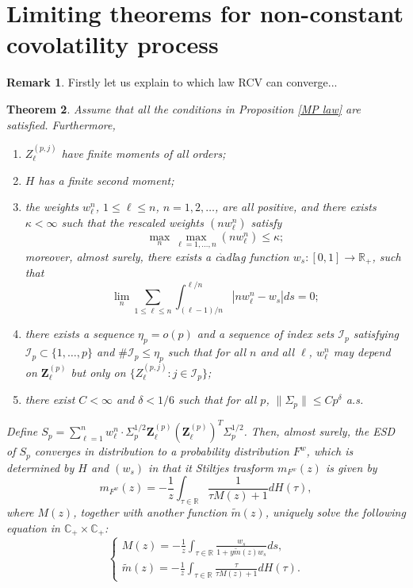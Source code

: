 \documentclass[a4paper,11pt]{article}
\theoremstyle{plain}
\newtheorem{thm}{Theorem}[part]%
\theoremstyle{definition}
\newtheorem{rmrk}[thm]{Remark}
\newcommand{\MR}{\mathbb{R}}
\begin{document}
    \pagebreak
    \part{Limiting theorems for non-constant covolatility process}
    
    \begin{rmrk}
    	Firstly let us explain to which law RCV can converge...
    \end{rmrk}
    
    \begin{thm} \label{Thm 1}
    	Assume that all the conditions in Proposition \ref{MP law} are satisfied. Furthermore,
    	\begin{enumerate}
    		\item $Z_\ell^{(p, j)}$ have finite moments of all orders;
    		\item $H$ has a finite second moment;
    		\item the weights $w_\ell^n$, $1 \leq \ell \leq n$, $n = 1, 2, \dots$, are all positive, and there exists $\kappa < \infty$ such that the rescaled weights $(nw_\ell^n)$ satisfy
    		\[ \max_n \max_{\ell = 1, \dots, n} (nw_\ell^n) \leq \kappa; \]
    		moreover, almost surely, there exists a c$\grave{\text{a}}$dl$\grave{\text{a}}$g function $w_s: [0, 1] \rightarrow \MR_{+}$, such that
    		\[ \lim_n \sum_{1 \leq \ell \leq n} \int_{(\ell-1)/n}^{\ell/n} |n w_\ell^n - w_s|ds = 0; \]
    		\item there exists a sequence $\eta_p = o(p)$ and a sequence of index sets $\mathcal{I}_p$ satisfying $\mathcal{I}_p \subset \{1, \dots, p\}$ and $\#\mathcal{I}_p \leq \eta_p$ such that for all $n$ and all $\ell$, $w_\ell^n$ may depend on $\mathbf{Z}_\ell^{(p)}$ but only on $\{ Z_\ell^{(p,j)}: j \in \mathcal{I}_p \}$;
    		\item there exist $C < \infty$ and $\delta < 1/6$ such that for all $p$, $\| \Sigma_p \| \leq Cp^\delta$ a.s.
    	\end{enumerate}
    	Define $S_p = \sum_{\ell=1}^{n} w_\ell^n \cdot \Sigma_p^{1/2} \mathbf{Z}_\ell^{(p)} (\mathbf{Z}_\ell^{(p)})^T\Sigma_p^{1/2} $. Then, almost surely, the ESD of $S_p$ converges in distribution to a probability distribution $F^w$, which is determined by $H$ and $(w_s)$ in that it Stiltjes trasform $m_{F^w}(z)$ is given by
    	\[ m_{F^w}(z) = -\frac{1}{z} \int_{\tau \in \MR} \frac{1}{\tau M(z) + 1} dH(\tau), \]
    	where $M(z)$, together with another function $\tilde{m}(z)$, uniquely solve the following equation in $\mathbb{C}_{+} \times \mathbb{C}_{+}$:
    	\[
    	\left \{
    	\begin{array}{l}
    		M(z) = -\frac{1}{z} \int_{\tau \in \MR} \frac{w_s}{1 + y \tilde{m}(z)w_s} ds,  \\
    		\tilde{m}(z) =  -\frac{1}{z} \int_{\tau \in \MR} \frac{\tau}{\tau M(z) + 1} dH(\tau).
    	\end{array}
    	\right.
    	\]
    \end{thm}
    
\end{document}
